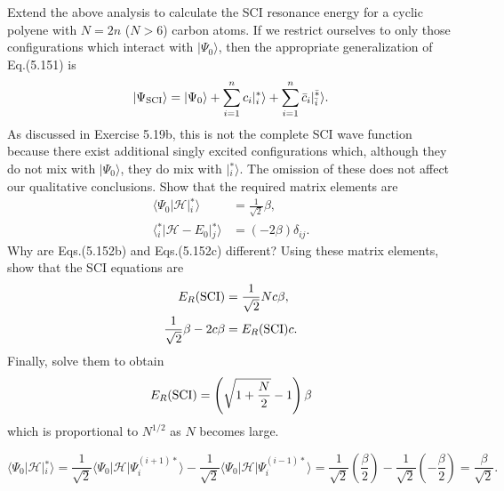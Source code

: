 \documentclass[a4paper]{book}
\newcounter{exercise}[chapter]
\newcounter{solution}[chapter]
\begin{document}
	\begin{exercise}
	Extend the above analysis to calculate the SCI resonance energy for a cyclic polyene with $N=2n$ ($N>6$) carbon atoms. If we restrict ourselves to only those configurations which interact with $| \Psi_0 \rangle$, then the appropriate generalization of Eq.(5.151) is
	\[
		| \Psi_{\rm SCI} \rangle = | \Psi_0 \rangle + \sum_{i=1}^n c_i | {}^*_i \rangle + \sum_{i=1}^n \bar{c}_i | {}^{\bar{*}}_{\bar{i}}\rangle.
	\]
	As discussed in Exercise 5.19b, this is not the complete SCI wave function because there exist additional singly excited configurations which, although they do not mix with $|\Psi_0\rangle$, they do mix with $| {}^*_i \rangle$. The omission of these does not affect our qualitative conclusions. Show that the required matrix elements are
	\begin{align*}
		\langle \Psi_0 | \mathscr{H} | {}^*_i \rangle &= \frac{1}{\sqrt{2}} \beta, \\
		\langle {}^*_i | \mathscr{H} - E_0 | {}^*_j \rangle &= (-2\beta) \delta_{ij}.
	\end{align*}
	Why are Eqs.(5.152b) and Eqs.(5.152c) different? Using these matrix elements, show that the SCI equations are
	\begin{align*}
		E_R ({\rm SCI}) &= \frac{1}{\sqrt{2}} Nc \beta , \\
		\frac{1}{\sqrt{2}} \beta - 2c \beta &= E_R( {\rm SCI} )c.
	\end{align*}
	Finally, solve them to obtain
	\[
		E_R ({\rm SCI}) = \left( \sqrt{ 1 + \frac{N}{2} } - 1 \right) \beta
	\]
	which is proportional to $N^{1/2}$ as $N$ becomes large.
	\end{exercise}
	
	\begin{solution}
	
	\[
		\langle \Psi_0 | \mathscr{H} | {}^*_i \rangle = \frac{1}{ \sqrt{2} } \langle \Psi_0 | \mathscr{H} | \Psi^{(i+1)*}_i \rangle - \frac{1}{ \sqrt{2} } \langle \Psi_0 | \mathscr{H} | \Psi^{(i-1)*}_i \rangle = \frac{1}{ \sqrt{2} } \left( \frac{ \beta }{2} \right) - \frac{1}{ \sqrt{2} } \left( - \frac{ \beta }{2} \right) = \frac{ \beta }{ \sqrt{2} }.
	\]	
	
	\end{solution}
\end{document}
